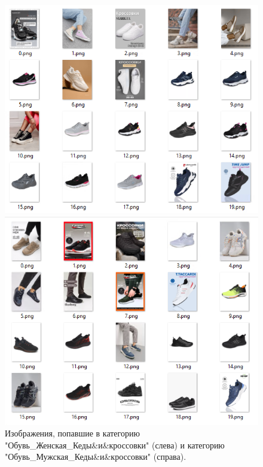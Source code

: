 \documentclass[a4paper,12pt]{extarticle}
\begin{document}
\begin{figure}[ht]
	\centering
	\begin{minipage}[b]{3in}
		\includegraphics[scale=0.5]{classification/classification_exampleshoes1.png}
	\end{minipage}
	\hfill
	\begin{minipage}[b]{3in}
		\includegraphics[scale=0.5]{classification/classification_exampleshoes2.png}
	\end{minipage}
	\caption{Изображения, попавшие в категорию "Обувь\_Женская\_Кеды\&и\&кроссовки" (слева) и  категорию "Обувь\_Мужская\_Кеды\&и\&кроссовки" (справа).}
	\label{fig:classification_exampleshoes}
\end{figure}
\end{document}
